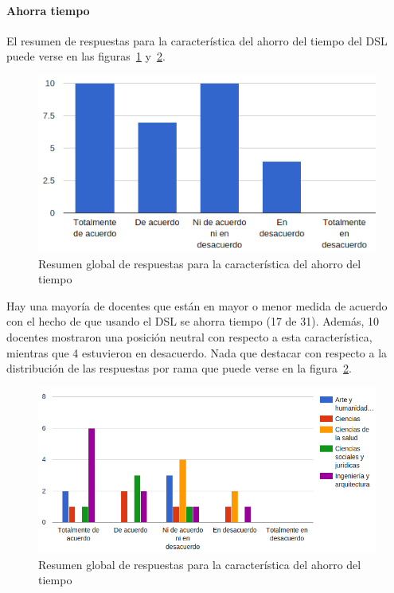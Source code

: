 \newpage
\paragraph*{Ahorra tiempo}

El resumen de respuestas para la característica del ahorro del tiempo del DSL puede verse en las figuras~\ref{fig:evalmetodo:dsl:ahorro} y~\ref{fig:evalmetodo:dsl:ahorro:rama}.

\begin{figure}[h]
  \begin{center}
    \includegraphics[scale=0.5]{C_DSL_ahorro.png}
  \end{center}
  \caption{Resumen global de respuestas para la característica del ahorro del tiempo}
  \label{fig:evalmetodo:dsl:ahorro}
\end{figure}

Hay una mayoría de docentes que están en mayor o menor medida de acuerdo con el hecho de que usando el DSL se ahorra tiempo (17 de 31). Además, 10 docentes mostraron una posición neutral con respecto a esta característica, mientras que 4 estuvieron en desacuerdo. Nada que destacar con respecto a la distribución de las respuestas por rama que puede verse en la figura~\ref{fig:evalmetodo:dsl:ahorro:rama}.

\begin{figure}[h]
  \begin{center}
    \includegraphics[scale=0.5]{C_DSL_ahorro_rama.png}
  \end{center}
  \caption{Resumen global de respuestas para la característica del ahorro del tiempo}
  \label{fig:evalmetodo:dsl:ahorro:rama}
\end{figure}

